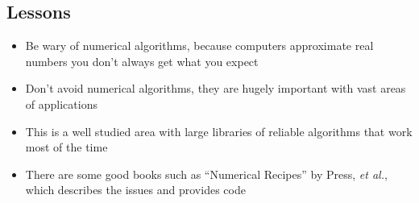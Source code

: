 
\begin{slide}
\section{Lessons}

\begin{PauseHighLight}
  \begin{itemize}
  \item Be wary of numerical algorithms, because computers approximate
    real numbers you don't always get what you expect\pause
  \item Don't avoid numerical algorithms, they are hugely important with
    vast areas of applications\pause
  \item This is a well studied area with large libraries of reliable
    algorithms that work most of the time\pause
  \item There are some good books such as ``Numerical Recipes'' by
    Press, \textit{et al.}, which describes the issues and provides
    code\pause
  \end{itemize}
\end{PauseHighLight}

\end{slide}
